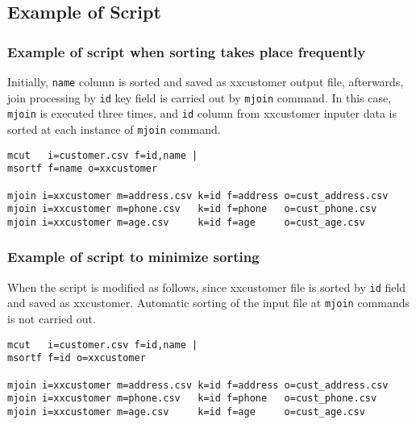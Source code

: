 \subsection*{Example of Script}

\subsubsection*{Example of script when sorting takes place frequently}

Initially, \verb|name| column is sorted and saved as xxcustomer output file, afterwards, join processing by \verb|id| key field is carried out by \verb|mjoin| command. In this case, \verb|mjoin| is executed three times, and \verb|id| column from xxcustomer inputer data is sorted at each instance of \verb|mjoin| command. 


\begin{Verbatim}[baselinestretch=0.7,frame=single]
mcut   i=customer.csv f=id,name |
msortf f=name o=xxcustomer

mjoin i=xxcustomer m=address.csv k=id f=address o=cust_address.csv
mjoin i=xxcustomer m=phone.csv   k=id f=phone   o=cust_phone.csv
mjoin i=xxcustomer m=age.csv     k=id f=age     o=cust_age.csv
\end{Verbatim}

\subsubsection*{Example of script to minimize sorting}

When the script is modified as follows, since xxcustomer file is sorted by \verb|id| field and saved as xxcustomer. Automatic sorting of the input file at \verb|mjoin| commands is not carried out. 


\begin{Verbatim}[baselinestretch=0.7,frame=single]
mcut   i=customer.csv f=id,name |
msortf f=id o=xxcustomer

mjoin i=xxcustomer m=address.csv k=id f=address o=cust_address.csv
mjoin i=xxcustomer m=phone.csv   k=id f=phone   o=cust_phone.csv
mjoin i=xxcustomer m=age.csv     k=id f=age     o=cust_age.csv
\end{Verbatim}

%


